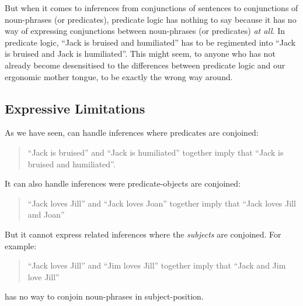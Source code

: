 But when it comes to inferences from conjunctions of sentences to conjunctions of noun-phrases (or predicates), predicate logic has nothing to say because it has no way of expressing conjunctions between noun-phrases (or predicates) \emph{at all}. In predicate logic, ``Jack is bruised and humiliated'' has to be regimented into ``Jack is bruised and Jack is humiliated''. 
This might seem, to anyone who has not already become desensitised to the differences between predicate logic and our ergonomic mother tongue, to be exactly the wrong way around.

\subsection{Expressive Limitations}
As we have seen, \ELFULL{} can handle inferences where predicates are conjoined:
\begin{quote}
``Jack is bruised'' and ``Jack is humiliated'' together imply that ``Jack is bruised and humiliated''.
\end{quote}
It can also handle inferences were predicate-objects are conjoined:
\begin{quote}
``Jack loves Jill'' and ``Jack loves Joan'' together imply that ``Jack loves Jill and Joan''
\end{quote}
But it cannot express related inferences where the \emph{subjects} are conjoined. For example:
\begin{quote}
``Jack loves Jill'' and ``Jim loves Jill'' together imply that ``Jack and Jim love Jill''
\end{quote}
\ELFULL{} has no way to conjoin noun-phrases in subject-position.
